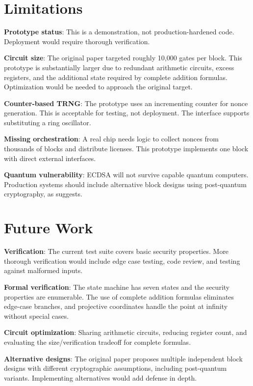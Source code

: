 \documentclass[11pt]{article}
\begin{document}
\section{Limitations}

\textbf{Prototype status}: This is a demonstration, not production-hardened code. Deployment would require thorough verification.

\textbf{Circuit size}: The original paper \cite{petrie2025} targeted roughly 10,000 gates per block. This prototype is substantially larger due to redundant arithmetic circuits, excess registers, and the additional state required by complete addition formulas. Optimization would be needed to approach the original target.

\textbf{Counter-based TRNG}: The prototype uses an incrementing counter for nonce generation. This is acceptable for testing, not deployment. The interface supports substituting a ring oscillator.

\textbf{Missing orchestration}: A real chip needs logic to collect nonces from thousands of blocks and distribute licenses. This prototype implements one block with direct external interfaces.

\textbf{Quantum vulnerability}: ECDSA will not survive capable quantum computers. Production systems should include alternative block designs using post-quantum cryptography, as \cite{petrie2025} suggests.

\section{Future Work}

\textbf{Verification}: The current test suite covers basic security properties. More thorough verification would include edge case testing, code review, and testing against malformed inputs.

\textbf{Formal verification}: The state machine has seven states and the security properties are enumerable. The use of complete addition formulas eliminates edge-case branches, and projective coordinates handle the point at infinity without special cases.

\textbf{Circuit optimization}: Sharing arithmetic circuits, reducing register count, and evaluating the size/verification tradeoff for complete formulas.

\textbf{Alternative designs}: The original paper proposes multiple independent block designs with different cryptographic assumptions, including post-quantum variants. Implementing alternatives would add defense in depth.
\end{document}
